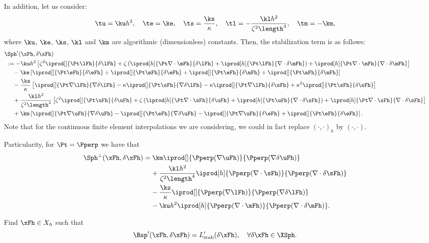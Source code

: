 In addition, let us consider:
$$
    \tu = \ku h^2, \quad 
    \te = \ke,\quad 
    \ts = \frac{\ks}{\kappa},\quad 
    \tl = -\frac{\kl h^2}{\zeta^2\length^4},\quad 
    \tm = -\km,
$$
where $\ku$, $\ke$, $\ks$, $\kl$ and $\km$ are algorithmic (dimensionless) constants. Then, the stabilization term is as follows:
\begin{align*}
& \Sph'(\xFh,\delta\xFh)\\
&~ :=-\ku h^2\left[\zeta^2\iprod[]{\Pt\lFh}{\delta\lFh}+\zeta\left(\iprod[h]{\Pt\nabla\cdot\mFh}{\delta\lFh}+\iprod[h]{\Pt\lFh}{\nabla\cdot\delta\mFh}\right)+\iprod[h]{\Pt\nabla\cdot\mFh}{\nabla\cdot\delta \mFh}\right]\\
&\quad\:\:-\ke\left[\iprod[]{\Pt\eFh}{\delta\eFh}+\iprod[]{\Pt\mFh}{\delta\eFh}+\iprod[]{\Pt\eFh}{\delta \mFh}+\iprod[]{\Pt\mFh}{\delta\mFh}\right]\\
&\quad\:\:-\frac{\ks}{\kappa}\left[\iprod[]{\Pt\nabla\lFh}{\nabla\delta\lFh}-\kappa\iprod[]{\Pt\sFh}{\nabla\delta\lFh}-\kappa\iprod[]{\Pt\nabla\lFh}{\delta\sFh}+\kappa^2\iprod[]{\Pt\sFh}{\delta\sFh}\right]\\
&\quad\:\:+\frac{\kl h^2}{\zeta^2\length^4}\left[\zeta^2\iprod[]{\Pt\uFh}{\delta\uFh}+\zeta\left(\iprod[h]{\Pt\nabla\cdot\sFh}{\delta\uFh}+\iprod[h]{\Pt\uFh}{\nabla\cdot\delta\sFh}\right)+\iprod[h]{\Pt\nabla\cdot\sFh}{\nabla\cdot\delta \sFh}\right]\\
&\quad\:\:+\km\left[\iprod[]{\Pt\nabla\uFh}{\nabla\delta\uFh}-
\iprod[]{\Pt\eFh}{\nabla\delta\uFh}-\iprod[]{\Pt\nabla\uFh}{\delta\eFh}+\iprod[]{\Pt\eFh}{\delta\eFh}\right]. 
\end{align*}
Note that for the continuous finite element interpolations we are considering, we could in fact replace $(\cdot,\cdot)_h$ by $(\cdot,\cdot)$.

Particularity, for $\Pt = \Pperp$ we have that
\begin{align*}
\Sph^\perp(\xFh,\delta\xFh)
&=\km \iprod[]{\Pperp(\nabla\uFh)}{\Pperp(\nabla\delta\uFh)}\\
&\:\:\:\:\:
+\frac{\kl h^2}{\zeta^2\length^4}\iprod[h]{\Pperp(\nabla\cdot\sFh)}{\Pperp(\nabla\cdot\delta\sFh)}\\
&\:\:\:\:\:-\frac{\ks}{\kappa}\iprod[]{\Pperp(\nabla\lFh)}{\Pperp(\nabla\delta\lFh)}\\
&\:\:\:\:\:
-\ku h^2\iprod[h]{\Pperp(\nabla\cdot\mFh)}{\Pperp(\nabla\cdot\delta\mFh)}.
\end{align*}

\begin{problem}[$P_{\mathrm{p},h}$] Find $\xFh \in X_h$ such that
\begin{equation}
\Bsp'(\xFh,\delta \xFh) = L'_{\mathrm{stab}}(\delta\xFh),\quad\forall\delta\xFh\in\XSph. 
\end{equation} 
\end{problem}

